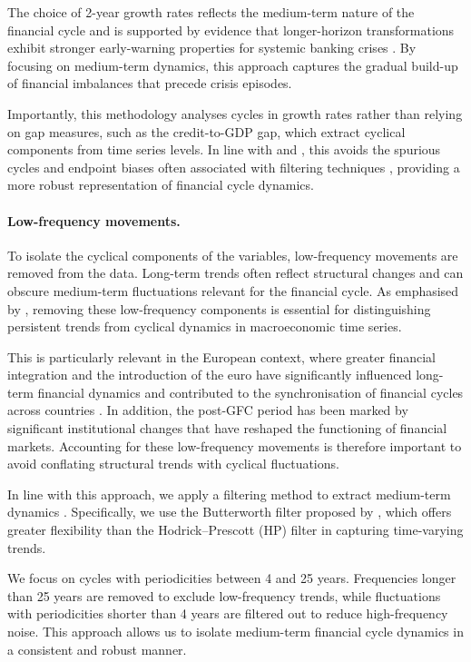 The choice of 2-year growth rates reflects the medium-term nature of the financial cycle and is supported by evidence that longer-horizon transformations exhibit stronger early-warning properties for systemic banking crises \citep{lang2019anticipating}. By focusing on medium-term dynamics, this approach captures the gradual build-up of financial imbalances that precede crisis episodes.

Importantly, this methodology analyses cycles in growth rates rather than relying on gap measures, such as the credit-to-GDP gap, which extract cyclical components from time series levels. In line with \citet{schuler2020financial} and \citet{lang2019anticipating}, this avoids the spurious cycles and endpoint biases often associated with filtering techniques \citep{schuler2018detrending}, providing a more robust representation of financial cycle dynamics.

\paragraph{Low-frequency movements.}
To isolate the cyclical components of the variables, low-frequency movements are removed from the data. Long-term trends often reflect structural changes and can obscure medium-term fluctuations relevant for the financial cycle. As emphasised by \citet{stock2016dynamic}, removing these low-frequency components is essential for distinguishing persistent trends from cyclical dynamics in macroeconomic time series.

This is particularly relevant in the European context, where greater financial integration and the introduction of the euro have significantly influenced long-term financial dynamics and contributed to the synchronisation of financial cycles across countries \citep{jorda2018global, aikman2015curbing}. In addition, the post-GFC period has been marked by significant institutional changes that have reshaped the functioning of financial markets. Accounting for these low-frequency movements is therefore important to avoid conflating structural trends with cyclical fluctuations.

In line with this approach, we apply a filtering method to extract medium-term dynamics \citep{drehmann2012characterising, schuler2020financial}. Specifically, we use the Butterworth filter proposed by \citet{pollock2000trend}, which offers greater flexibility than the Hodrick--Prescott (HP) filter in capturing time-varying trends.

We focus on cycles with periodicities between 4 and 25 years. Frequencies longer than 25 years are removed to exclude low-frequency trends, while fluctuations with periodicities shorter than 4 years are filtered out to reduce high-frequency noise. This approach allows us to isolate medium-term financial cycle dynamics in a consistent and robust manner.

